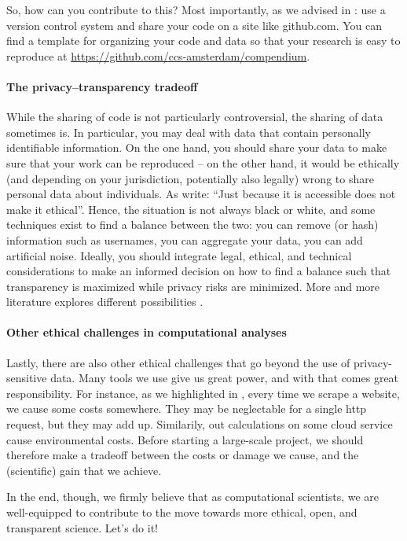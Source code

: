 So, how can you contribute to this? Most importantly, as we advised in : use a version control system
and share your code on a site like github.com. You can find a template for organizing your code and data so that your
research is easy to reproduce at \url{https://github.com/ccs-amsterdam/compendium}. 

\paragraph{The privacy--transparency tradeoff} While the sharing of code is not particularly controversial, the sharing of
data sometimes is. In particular, you may deal with data that contain personally identifiable information. On the one
hand, you should share your data to make sure that your work can be reproduced -- on the other hand, it would be ethically
(and depending on your jurisdiction, potentially also legally) wrong to share personal data about individuals.
As \cite{boyd2012} write: ``Just because it is accessible does not make it ethical''. Hence, the
situation is not always black or white, and some techniques exist to find a balance between the two: you can remove
(or hash) information such as usernames, you can aggregate your data, you can add artificial noise. Ideally, you should
integrate legal, ethical, and technical considerations to make an informed decision on how to find a balance such that
transparency is maximized while privacy risks are minimized. More and more literature explores different possibilities \cite[e.g.][]{Breuer2020}.


\paragraph{Other ethical challenges in computational analyses} 
Lastly, there are also other ethical challenges that go beyond the use of privacy-sensitive data. Many tools we
use give us great power, and with that comes great responsibility. For instance, as we highlighted in
, every time we scrape a website, we cause some costs somewhere. They may be
neglectable for a single http request, but they may add up. Similarily, out calculations on some cloud service
cause environmental costs. Before starting a large-scale project, we should therefore make a tradeoff between
the costs or damage we cause, and the (scientific) gain that we achieve.

In the end, though, we firmly believe that as computational scientists, we are well-equipped to contribute to the move towards
more ethical, open, and transparent science. Let's do it!
